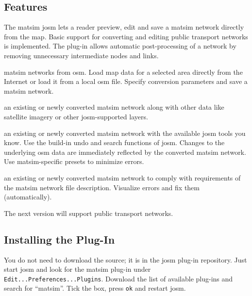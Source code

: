 \subsection{Features}
The \gls{matsim} \gls{josm} lets a reader preview, edit and save a \gls{matsim} network directly from the map. Basic support for converting and editing public transport networks is implemented. The plug-in allows automatic post-processing of a network by removing unnecessary intermediate nodes and links.
\begin{description}\styleDescription
\item[Convert] \gls{matsim} networks from \gls{osm}. Load map data for a selected area directly from the Internet or load it from a local \gls{osm} file. Specify conversion parameters and save a \gls{matsim} network.
\item[Visualize] an existing or newly converted \gls{matsim} network along with other data like satellite imagery or other \gls{josm}-supported layers.
\item[Edit] an existing or newly converted \gls{matsim} network with the available \gls{josm} tools you know. Use the build-in undo and search functions of \gls{josm}. Changes to the underlying \gls{osm} data are immediately reflected by the converted \gls{matsim} network. Use \gls{matsim}-specific presets to minimize errors.
\item[Validate] an existing or newly converted \gls{matsim} network to comply with requirements of the \gls{matsim} network file description. Visualize errors and fix them (automatically). 
\end{description}
The next version will support public transport networks.

\subsection{Installing the Plug-In}
You do not need to download the source; it is in the \gls{josm} plug-in repository. Just start \gls{josm} and look for the \gls{matsim} plug-in under \lstinline|Edit...Preferences...Plugins|. Download the list of available plug-ins and search for ``matsim''. Tick the box, press \lstinline|ok| and restart \gls{josm}.

